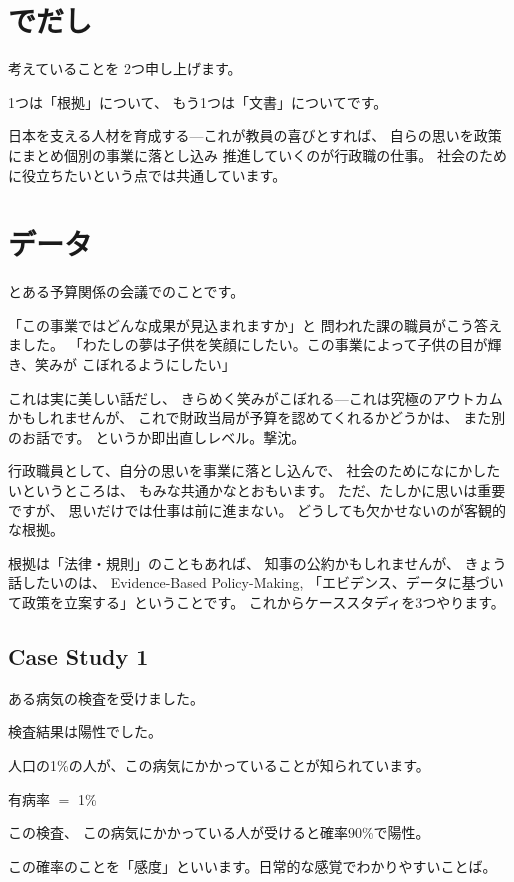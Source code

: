 \documentclass[uplatex,jis2004,dvipdfmx,12pt]{jsarticle}
\begin{document}
\section{でだし}
考えていることを
2つ申し上げます。

1つは「根拠」について、
もう1つは「文書」についてです。


日本を支える人材を育成する---これが教員の喜びとすれば、
自らの思いを政策にまとめ個別の事業に落とし込み
推進していくのが行政職の仕事。
社会のために役立ちたいという点では共通しています。


\section{データ}
とある予算関係の会議でのことです。

「この事業ではどんな成果が見込まれますか」と
問われた課の職員がこう答えました。
「わたしの夢は子供を笑顔にしたい。この事業によって子供の目が輝き、笑みが
こぼれるようにしたい」

これは実に美しい話だし、
きらめく笑みがこぼれる---これは究極のアウトカムかもしれませんが、
これで財政当局が予算を認めてくれるかどうかは、
また別のお話です。
というか即出直しレベル。撃沈。




行政職員として、自分の思いを事業に落とし込んで、
社会のためになにかしたいというところは、
もみな共通かなとおもいます。
ただ、たしかに思いは重要ですが、
思いだけでは仕事は前に進まない。
どうしても欠かせないのが客観的な根拠。



根拠は「法律・規則」のこともあれば、
知事の公約かもしれませんが、
きょう話したいのは、
Evidence-Based Policy-Making,
「エビデンス、データに基づいて政策を立案する」ということです。
これからケーススタディを3つやります。

\subsection{Case Study 1}

ある病気の検査を受けました。

検査結果は陽性でした。

人口の1\%の人が、この病気にかかっていることが知られています。

有病率 $=$ 1\%

この検査、
この病気にかかっている人が受けると確率90\%で陽性。

この確率のことを「感度」といいます。日常的な感覚でわかりやすいことば。
\end{document}
